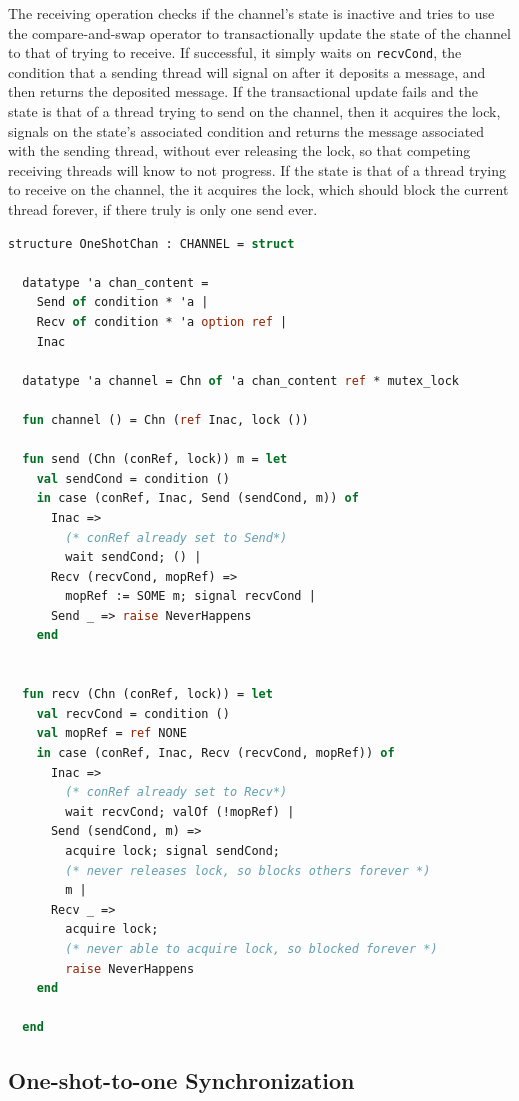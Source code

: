 \documentclass[10pt]{article}
\begin{document}
The receiving operation checks if the channel's state is inactive and tries to use the
compare-and-swap operator to transactionally update the state of the channel to that of trying
to receive.  If successful, it simply waits on \lstinline{recvCond}, the condition that a sending thread
will signal on after it deposits a message, and then returns the deposited message.  If the
transactional update fails and the state is that of a thread trying to send on the channel,
then it acquires the lock, signals on the state's associated condition and returns the message
associated with the sending thread, without ever releasing the lock, so that competing
receiving threads will know to not progress.  If the state is that of a thread trying to
receive on the channel, the it acquires the lock, which should block the current thread
forever, if there truly is only one send ever.


\begin{lstlisting}[language=ML, mathescape]
  structure OneShotChan : CHANNEL = struct

  datatype 'a chan_content =
    Send of condition * 'a |
    Recv of condition * 'a option ref |
    Inac  

  datatype 'a channel = Chn of 'a chan_content ref * mutex_lock

  fun channel () = Chn (ref Inac, lock ())

  fun send (Chn (conRef, lock)) m = let
    val sendCond = condition ()
    in case (conRef, Inac, Send (sendCond, m)) of
      Inac =>
        (* conRef already set to Send*)
        wait sendCond; () |
      Recv (recvCond, mopRef) =>
        mopRef := SOME m; signal recvCond |
      Send _ => raise NeverHappens
    end


  fun recv (Chn (conRef, lock)) = let
    val recvCond = condition ()
    val mopRef = ref NONE 
    in case (conRef, Inac, Recv (recvCond, mopRef)) of
      Inac =>
        (* conRef already set to Recv*)
        wait recvCond; valOf (!mopRef) |
      Send (sendCond, m) =>
        acquire lock; signal sendCond;
        (* never releases lock, so blocks others forever *)
        m |
      Recv _ =>
        acquire lock;
        (* never able to acquire lock, so blocked forever *)
        raise NeverHappens
    end

  end
  \end{lstlisting}


\subsection{One-shot-to-one Synchronization}
\end{document}

